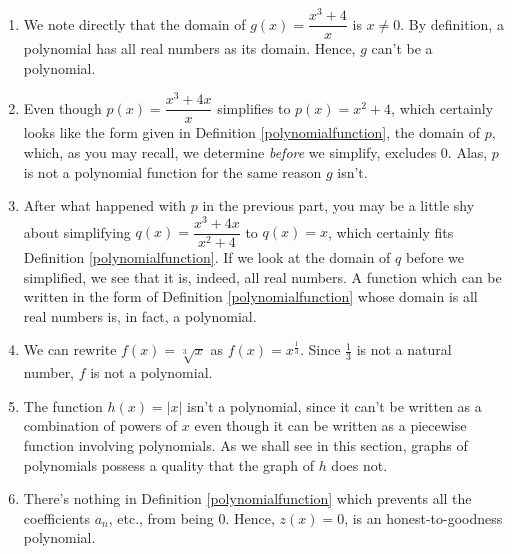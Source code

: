{
\begin{enumerate}

\item  We note directly that the domain of $g(x) = \dfrac{x^3+4}{x}$ is $x \neq 0$.  By definition, a polynomial has all real numbers as its domain.  Hence, $g$ can't be a polynomial.

\item  Even though $p(x) = \dfrac{x^3+4x}{x}$ simplifies to $p(x) = x^2+4$, which certainly looks like the form given in Definition \ref{polynomialfunction}, the domain of $p$, which, as you may recall, we determine \emph{before} we simplify, excludes $0$.  Alas, $p$ is not a polynomial function for the same reason $g$ isn't.

\item  After what happened with $p$ in the previous part, you may be a little shy about simplifying $q(x) = \dfrac{x^3+4x}{x^2+4}$ to $q(x) = x$, which certainly fits Definition \ref{polynomialfunction}.  If we look at the domain of $q$ before we simplified, we see that it is, indeed, all real numbers.  A function which can be written in the form of Definition \ref{polynomialfunction} whose domain is all real numbers is, in fact, a polynomial.  

\item  We can rewrite $f(x) =\sqrt[3]{x}$ as $f(x) = x^{\frac{1}{3}}$.  Since $\frac{1}{3}$ is not a natural number, $f$ is not a polynomial.

\item  The function $h(x) = |x|$ isn't a polynomial, since it can't be written as a combination of powers of $x$ even though it can be written as a piecewise function involving polynomials.  As we shall see in this section, graphs of polynomials possess a quality that the graph of $h$ does not.  


\item  There's nothing in Definition \ref{polynomialfunction} which prevents all the coefficients $a_{n}$, etc., from being $0$.  Hence, $z(x) = 0$, is an honest-to-goodness polynomial.

\end{enumerate}
}


\smallskip

